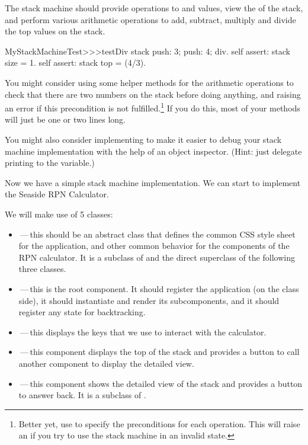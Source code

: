 \documentclass[a4paper,10pt,twoside]{book}
\begin{document}
The stack machine should provide operations to  and  values, view the  of the stack, and perform various arithmetic operations to add, subtract, multiply and divide the top values on the stack.


\begin{code}{}
MyStackMachineTest>>>testDiv
	stack
		push: 3;
		push: 4;
		div.
	self assert: stack size = 1.
	self assert: stack top = (4/3).
\end{code}

You might consider using some helper methods for the arithmetic operations to check that there are two numbers on the stack before doing anything, and raising an error if this precondition is not fulfilled.\footnote{Better yet, use  to specify the preconditions for each operation.
This will raise an  if you try to use the stack machine in an invalid state.}
If you do this, most  of your methods will just be one or two lines long.

You might also consider implementing  to make it easier to debug your stack machine implementation with the help of an object inspector.
(Hint: just delegate printing to the  variable.)


Now we have a simple stack machine implementation.
We can start to implement the Seaside RPN Calculator.

We will make use of 5 classes:
\begin{itemize}
  \item {}\,---\,this should be an abstract class that defines the common CSS style sheet for the application, and other common behavior for the components of the RPN calculator.
  It is a subclass of  and the direct superclass of the following three classes. 
  \item {}\,---\,this is the root component.
  It should register the application (on the class side), it should instantiate and render its subcomponents, and it should register any state for backtracking.
  \item {}\,---\,this displays the keys that we use to interact with the calculator.
  \item {}\,---\,this component displays the top of the stack and provides a button to call another component to display the detailed view.
  \item {}\,---\,this component shows the detailed view of the stack and provides a button to answer back.
  It is a subclass of .
\end{itemize}
\end{document}
